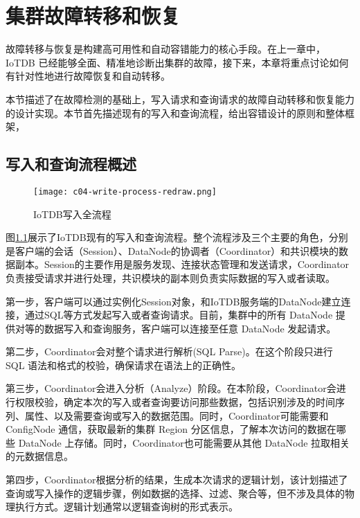
\chapter{集群故障转移和恢复}

故障转移与恢复是构建高可用性和自动容错能力的核心手段。在上一章中，IoTDB 已经能够全面、精准地诊断出集群的故障，接下来，本章将重点讨论如何有针对性地进行故障恢复和自动转移。

本节描述了在故障检测的基础上，写入请求和查询请求的故障自动转移和恢复能力的设计实现。本节首先描述现有的写入和查询流程，给出容错设计的原则和整体框架，

\section{写入和查询流程概述}

\begin{figure}
  \centering
  \texttt{[image: c04-write-process-redraw.png]}
  \caption{IoTDB写入全流程}
  \label{fig:c04-write-process}
\end{figure}

图\ref{fig:c04-write-process}展示了IoTDB现有的写入和查询流程。整个流程涉及三个主要的角色，分别是客户端的会话（Session）、DataNode的协调者（Coordinator）和共识模块的数据副本。Session的主要作用是服务发现、连接状态管理和发送请求，Coordinator负责接受请求并进行处理，共识模块的副本则负责实际数据的写入或者读取。

第一步，客户端可以通过实例化Session对象，和IoTDB服务端的DataNode建立连接，通过SQL等方式发起写入或者查询请求。目前，集群中的所有 DataNode 提供对等的数据写入和查询服务，客户端可以连接至任意 DataNode 发起请求。

第二步，Coordinator会对整个请求进行解析(SQL Parse)。在这个阶段只进行 SQL 语法和格式的校验，确保请求在语法上的正确性。

第三步，Coordinator会进入分析（Analyze）阶段。在本阶段，Coordinator会进行权限校验，确定本次的写入或者查询要访问那些数据，包括识别涉及的时间序列、属性、以及需要查询或写入的数据范围。同时，Coordinator可能需要和ConfigNode 通信，获取最新的集群 Region 分区信息，了解本次访问的数据在哪些 DataNode 上存储。同时，Coordinator也可能需要从其他 DataNode 拉取相关的元数据信息。

第四步，Coordinator根据分析的结果，生成本次请求的逻辑计划，该计划描述了查询或写入操作的逻辑步骤，例如数据的选择、过滤、聚合等，但不涉及具体的物理执行方式。逻辑计划通常以逻辑查询树的形式表示。

